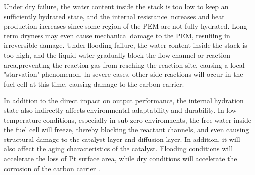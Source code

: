 \par
Under dry failure, the water content inside the stack is too low to keep an sufficiently hydrated state,
and the internal resistance increases and heat production increases since some region of the PEM are not fully hydrated.
Long-term dryness may even cause mechanical damage to the PEM, resulting in irreversible damage\cite{pattersonDamageCathodeCatalyst2006}.
Under flooding failure, the water content inside the stack is too high, and the liquid water gradually block the flow channel or reaction area,preventing the reaction gas from reaching the reaction site, causing a local "starvation" phenomenon\cite{chuExperimentalStudyInfluence2022,ohsModelingHydrogenStarvation2011}.
In severe cases, other side reactions  will occur in the fuel cell at this time, causing damage to the carbon carrier\cite{ohsModelingHydrogenStarvation2011,kuracinaStudySelectedCharacteristics2014,jiaMitigationStrategiesHydrogen2017}.
\par
In addition to the direct impact on output performance, the internal hydration state also indirectly affects environmental adaptability and durability\cite{yuanModelbasedObserversInternal2020,fuFuelCellHumidity2021}. In low temperature conditions, especially in sub-zero environments, the free water inside the fuel cell will freeze, thereby blocking the reactant channels, and even causing structural damage to the catalyst layer and diffusion layer\cite{taccaniEffectFlowField2011,doddsHydrogenFuelCell2015}. In addition, it will also affect the aging characteristics of the catalyst\cite{pattersonDamageCathodeCatalyst2006,sunModelingInfluenceGDL2005}. Flooding conditions will accelerate the loss of Pt surface area, while dry conditions will accelerate the corrosion of the carbon carrier \cite{yousfisteinerDiagnosisPolymerElectrolyte2011,chenOperationCharacteristicsCarbon2015}.
\par
